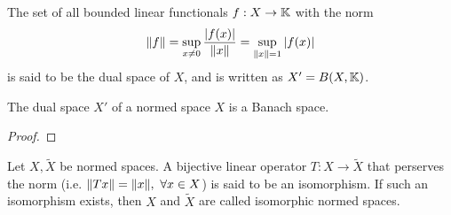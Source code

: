 \documentclass[../../script.tex]{subfiles}
\begin{document}
\begin{defi}
    The set of all bounded linear functionals $f: X \rightarrow \mathbb{K}$ with the norm 
    \[
        \norm{f} = \sup_{x \ne 0} \frac{\abs{f(x)}}{\norm{x}} = \sup_{\norm{x} = 1} \abs{f(x)}
    \]
    is said to be the dual space of $X$, and is written as $X' = B(X, \mathbb{K})$.
\end{defi}

\begin{thm}
    The dual space $X'$ of a normed space $X$ is a Banach space.
\end{thm}
\begin{proof}
    \noproof
\end{proof}

\begin{defi}
    Let $X, \tilde{X}$ be normed spaces. A bijective linear operator $T: X \rightarrow \tilde{X}$ that perserves the norm (i.e. $\norm{Tx} = \norm{x}, ~\forall x \in X$) is said to be an isomorphism.
    If such an isomorphism exists, then $X$ and $\tilde{X}$ are called isomorphic normed spaces.
\end{defi}
\end{document}
